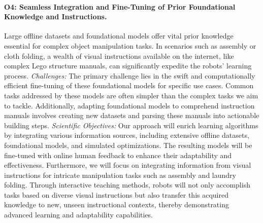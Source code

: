 \begin{refsection}
\vspace{-0.1cm}
\paragraph{O4: Seamless Integration and Fine-Tuning of Prior Foundational Knowledge and Instructions.} 
Large offline datasets and foundational models offer vital prior knowledge essential for complex object manipulation tasks. In scenarios such as assembly or cloth folding, a wealth of visual instructions available on the internet, like complex Lego structure manuals, can significantly expedite the robots' learning process. \newline
\textit{Challenges:} The primary challenge lies in the swift and computationally efficient fine-tuning of these foundational models for specific use cases. Common tasks addressed by these models are often simpler than the complex tasks we aim to tackle. Additionally, adapting foundational models to comprehend instruction manuals involves creating new datasets and parsing these manuals into actionable building steps. \newline
\textit{Scientific Objectives:} Our approach will enrich learning algorithms by integrating various information sources, including extensive offline datasets, foundational models, and simulated optimizations. The resulting models will be fine-tuned with online human feedback to enhance their adaptability and effectiveness. Furthermore, we will focus on integrating information from visual instructions for intricate manipulation tasks such as assembly and laundry folding. Through interactive teaching methods, robots will not only accomplish tasks based on diverse visual instructions but also transfer this acquired knowledge to new, unseen instructional contexts, thereby demonstrating advanced learning and adaptability capabilities.



\end{refsection}

